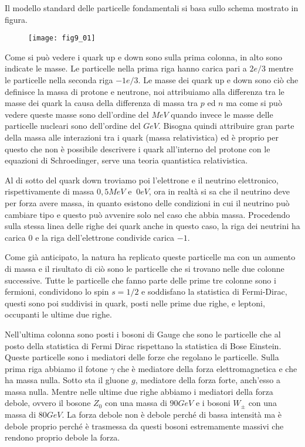 Il modello standard delle particelle fondamentali si basa sullo schema mostrato in figura.
\begin{figure}[h]
\centering
\texttt{[image: fig9\_01]}
\end{figure}

Come si può vedere i quark up e down sono sulla prima colonna, in alto sono indicate le masse.
Le particelle nella prima riga hanno carica pari a $2e/3$ mentre le particelle nella seconda riga $-1e/3$.
Le masse dei quark up e down sono ciò che definisce la massa di protone e neutrone, noi attribuiamo alla differenza tra le masse dei quark la causa della differenza di massa tra $p$ ed $n$ ma come si può vedere queste masse sono dell'ordine del $MeV$ quando invece le masse delle particelle nucleari sono dell'ordine del $GeV$.
Bisogna quindi attribuire gran parte della massa alle interazioni tra i quark (massa relativistica) ed è proprio per questo che non è possibile descrivere i quark all'interno del protone con le equazioni di Schroedinger, serve una teoria quantistica relativistica.

Al di sotto del quark down troviamo poi l'elettrone e il neutrino elettronico, rispettivamente di massa $0,5MeV$ e $~0eV$, ora in realtà si sa che il neutrino deve per forza avere massa, in quanto esistono delle condizioni in cui il neutrino può cambiare tipo e questo può avvenire solo nel caso che abbia massa.
Procedendo sulla stessa linea delle righe dei quark anche in questo caso, la riga dei neutrini ha carica $0$ e la riga dell'elettrone condivide carica $-1$.

Come già anticipato, la natura ha replicato queste particelle ma con un aumento di massa e il risultato di ciò sono le particelle che si trovano nelle due colonne successive.
Tutte le particelle che fanno parte delle prime tre colonne sono i fermioni, condividono lo spin $s=1/2$ e soddisfano la statistica di Fermi-Dirac, questi sono poi suddivisi in quark, posti nelle prime due righe, e leptoni, occupanti le ultime due righe.

Nell'ultima colonna sono posti i bosoni di Gauge che sono le particelle che al posto della statistica di Fermi Dirac rispettano la statistica di Bose Einstein.
Queste particelle sono i mediatori delle forze che regolano le particelle.
Sulla prima riga abbiamo il fotone $\gamma$ che è mediatore della forza elettromagnetica e che ha massa nulla.
Sotto sta il gluone $g$, mediatore della forza forte, anch'esso a massa nulla.
Mentre nelle ultime due righe abbiamo i mediatori della forza debole, ovvero il bosone $Z_0$ con una massa di $90GeV$ e i bosoni $W_\pm$ con una massa di $80GeV$.
La forza debole non è debole perché di bassa intensità ma è debole proprio perché è trasmessa da questi bosoni estremamente massivi che rendono proprio debole la forza.

